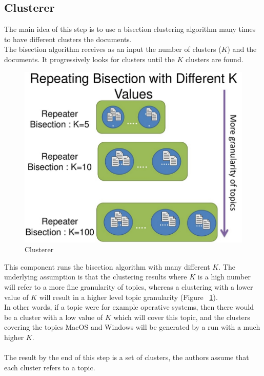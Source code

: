 \documentclass[4pt,a4paper]{article}
\begin{document}
\subsection{Clusterer}
The main idea of this step is to use a bisection clustering algorithm many times to have different clusters the documents.\\
The bisection algorithm receives as an input the number of clusters ($K$) and the documents. It progressively looks for clusters until the $K$ clusters are found.
\begin{figure}[]
  \centering
    \includegraphics[scale=0.2]{pics/clusterer2.jpg}
    \caption{Clusterer}
   \label{fig:clusterer}  
\end{figure}

This component runs the bisection algorithm with many different $K$. The underlying assumption is that the clustering results where $K$ is a high number will refer to a more fine granularity of topics, whereas a clustering with a lower value of $K$ will result in a higher level topic granularity (Figure ~\ref{fig:clusterer}).\\
In other words, if a topic were for example operative systems, then there would be a cluster with a low value of $K$ which will cover this topic, and the clusters covering the topics MacOS and Windows will be generated by a run with a much higher $K$.\\
\\
The result by the end of this step is a set of clusters, the authors assume that each cluster refers to a topic.
\end{document}
